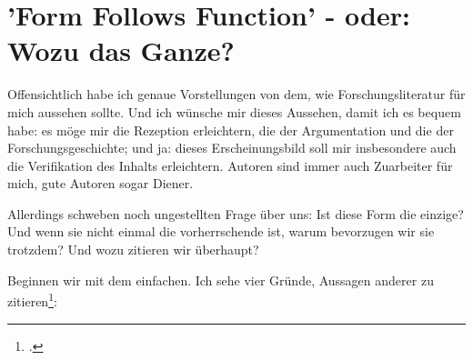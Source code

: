 %
%
%



\section{'Form Follows Function' - oder: Wozu das Ganze?}

Offensichtlich habe ich genaue Vorstellungen von dem, wie Forschungsliteratur
für mich aussehen sollte. Und ich wünsche mir dieses Aussehen, damit ich es
bequem habe: es möge mir die Rezeption erleichtern, die der Argumentation und
die der Forschungsgeschichte; und ja: dieses Erscheinungsbild soll mir
insbesondere auch die Verifikation des Inhalts erleichtern. Autoren sind immer
auch Zuarbeiter für mich, gute Autoren sogar Diener.

Allerdings schweben noch ungestellten Frage über uns: Ist diese Form die
einzige? Und wenn sie nicht einmal die vorherrschende ist, warum bevorzugen wir
sie trotzdem? Und wozu zitieren wir überhaupt?

Beginnen wir mit dem einfachen. Ich sehe vier Gründe, Aussagen anderer zu
zitieren\footcite[vgl. dazu auch][187. Die Autoren beschreiben die
Funktionen ähnlich, legen aber andere Schwer\-punk\-te: So läuft
das, was ich als affirmatives Zitat bezeichnen, bei ihnen als
'Bestätigung wissenschaftlicher Thesen durch anerkannte
Autoritäten oder Arbeiten', während das, was ich als
'konfrontatives Zitat' bezeichne, bei Ihnen nicht vorkommt]{RueStaFra1980a}:

